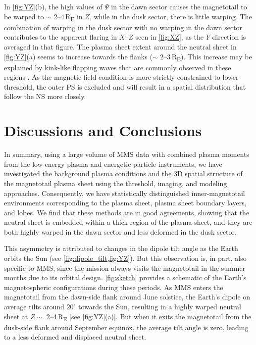 \documentclass[draft]{agujournal2019}
\begin{document}
In \cref{fig:YZ}(b), the high values of $\Psi$ in the dawn sector causes the magnetotail to be warped to $\sim$ 2--4\,\si{R_E} in $Z$, while in the dusk sector, there is little warping. The combination of warping in the dusk sector with no warping in the dawn sector contributes to the apparent flaring in $X$--$Z$ seen in \cref{fig:XZ}, as the $Y$ direction is averaged in that figure. The plasma sheet extent around the neutral sheet in \cref{fig:YZ}(a) seems to increase towards the flanks ($\sim$ 2--3\,\si{R_E}). This increase may be explained by kink-like flapping waves that are commonly observed in these regions \cite{Gao2018}. As the magnetic field condition is more strictly constrained to lower threshold, the outer PS is excluded and will result in a spatial distribution that follow the NS more closely.

\section{Discussions and Conclusions}\label{sec:conclude}

In summary, using a large volume of MMS data with combined plasma moments from the low-energy plasma and energetic particle instruments, we have investigated the background plasma conditions and the 3D spatial structure of the magnetotail plasma sheet using the threshold, imaging, and modeling approaches. Consequently, we have statistically distinguished inner-magnetotail environments corresponding to the plasma sheet, plasma sheet boundary layers, and lobes. We find that these methods are in good agreements, showing that the neutral sheet is embedded within a thick region of the plasma sheet, and they are both highly warped in the dawn sector and less deformed in the dusk sector.

This asymmetry is attributed to changes in the dipole tilt angle as the Earth orbits the Sun (see \cref{fig:dipole_tilt,fig:YZ}). But this observation is, in part, also specific to MMS, since the mission always visits the magnetotail in the summer months due to its orbital design. \cref{fig:sketch} provides a schematic of the Earth's magnetospheric configurations during these periods. As MMS enters the magnetotail from the dawn-side flank around June solstice, the Earth's dipole on average tilts around $20^\circ$ towards the Sun, resulting in a highly warped neutral sheet at $Z\sim$ 2--4\,\si{R_E} [see \cref{fig:YZ}(a)]. But when it exits the magnetotail from the dusk-side flank around September equinox, the average tilt angle is zero, leading to a less deformed and displaced neutral sheet.
\end{document}

